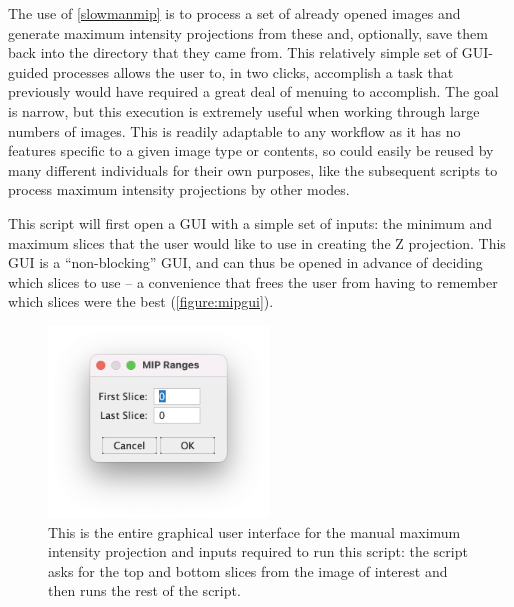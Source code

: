The use of \autoref{slowmanmip} is to process a set of already opened images and generate maximum intensity projections from these and, optionally, save them back into the directory that they came from. This relatively simple set of GUI\hyp{}guided processes allows the user to, in two clicks, accomplish a task that previously would have required a great deal of menuing to accomplish. The goal is narrow, but this execution is extremely useful when working through large numbers of images. This is readily adaptable to any workflow as it has no features specific to a given image type or contents, so could easily be reused by many different individuals for their own purposes, like the subsequent scripts to process maximum intensity projections by other modes.

This script will first open a GUI with a simple set of inputs: the minimum and maximum slices that the user would like to use in creating the Z projection. This GUI is a ``non\hyp{}blocking'' GUI, and can thus be opened in advance of deciding which slices to use -- a convenience that frees the user from having to remember which slices were the best (\autoref{figure:mipgui}). 

\begin{figure}
\centering
\includegraphics[height=2in]{images/mipgui.png}
\caption[GUI for manual maximum intensity projections]{This is the entire graphical user interface for the manual maximum intensity projection and inputs required to run this script: the script asks for the top and bottom slices from the image of interest and then runs the rest of the script.}
\label{figure:mipgui}
\end{figure}


